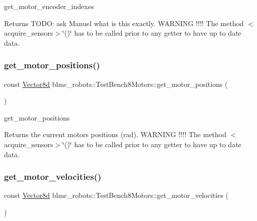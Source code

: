 get\+\_\+motor\+\_\+encoder\+\_\+indexes 

\begin{DoxyReturn}{Returns}
T\+O\+DO\+: ask Manuel what is this exactly. W\+A\+R\+N\+I\+NG !!!! The method $<$acquire\+\_\+sensors$>$\char`\"{}()\char`\"{} has to be called prior to any getter to have up to date data. 
\end{DoxyReturn}
\mbox{\label{classblmc__robots_1_1TestBench8Motors_a9372bd2722944fa510aa56323f8955b8}} 
\subsubsection{\texorpdfstring{get\+\_\+motor\+\_\+positions()}{get\_motor\_positions()}}
{\footnotesize\ttfamily const \hyperlink{common__header_8hpp_a98975ffbe0bca1296078e0350dfedd60}{Vector8d} blmc\+\_\+robots\+::\+Test\+Bench8\+Motors\+::get\+\_\+motor\+\_\+positions (\begin{DoxyParamCaption}{ }\end{DoxyParamCaption})\hspace{0.3cm}{\ttfamily [inline]}}



get\+\_\+motor\+\_\+positions 

\begin{DoxyReturn}{Returns}
the current motors positions (rad). W\+A\+R\+N\+I\+NG !!!! The method $<$acquire\+\_\+sensors$>$\char`\"{}()\char`\"{} has to be called prior to any getter to have up to date data. 
\end{DoxyReturn}
\mbox{\label{classblmc__robots_1_1TestBench8Motors_aaf4aa80251af98000ffad95eddf0b449}} 
\subsubsection{\texorpdfstring{get\+\_\+motor\+\_\+velocities()}{get\_motor\_velocities()}}
{\footnotesize\ttfamily const \hyperlink{common__header_8hpp_a98975ffbe0bca1296078e0350dfedd60}{Vector8d} blmc\+\_\+robots\+::\+Test\+Bench8\+Motors\+::get\+\_\+motor\+\_\+velocities (\begin{DoxyParamCaption}{ }\end{DoxyParamCaption})\hspace{0.3cm}{\ttfamily [inline]}}



